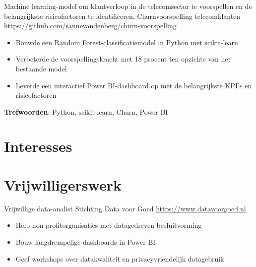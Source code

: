 \documentclass[a4paper, serif, 10pt]{moderncv}
\begin{document}
        {Machine learning-model om klantverloop in de telecomsector te voorspellen en de belangrijkste risicofactoren te identificeren.}
        {Churnvoorspelling telecomklanten}
        {\url{https://github.com/sannevandenberg/churn-voorspelling}}
        {}
        {\begin{itemize}
\item Bouwde een Random Forest-classificatiemodel in Python met scikit-learn
\item Verbeterde de voorspellingskracht met 18 procent ten opzichte van het bestaande model
\item Leverde een interactief Power BI-dashboard op met de belangrijkste KPI's en risicofactoren
\end{itemize}
\textbf{Trefwoorden}: Python, scikit-learn, Churn, Power BI}
\section{Interesses}

\section{Vrijwilligerswerk}

        {Vrijwillige data-analist}
        {Stichting Data voor Goed}
        {\url{https://www.datavoorgoed.nl}}
        {}
        {\begin{itemize}
\item Help non-profitorganisaties met datagedreven besluitvorming
\item Bouw laagdrempelige dashboards in Power BI
\item Geef workshops over datakwaliteit en privacyvriendelijk datagebruik
\end{itemize}}
    
\end{document}
